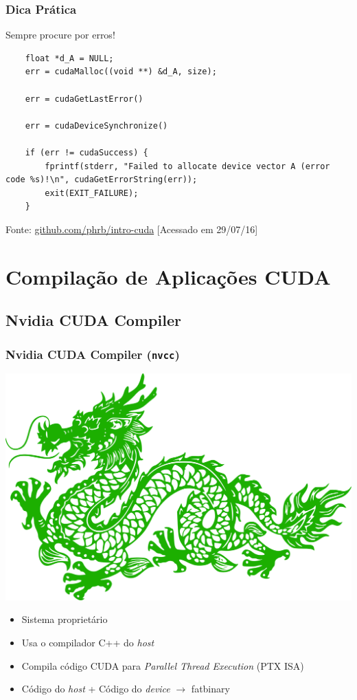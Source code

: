 \documentclass[10pt, compress]{beamer}
\begin{document}
\begin{frame}[fragile]
    \frametitle{Dica Prática}
    \alert{Sempre} procure por erros!

    \begin{lstlisting}
    float *d_A = NULL;
    err = cudaMalloc((void **) &d_A, size);

    err = cudaGetLastError()

    err = cudaDeviceSynchronize()

    if (err != cudaSuccess) {
        fprintf(stderr, "Failed to allocate device vector A (error code %s)!\n", cudaGetErrorString(err));
        exit(EXIT_FAILURE);
    }
    \end{lstlisting}

    \begin{center}
        \tiny{Fonte: \url{github.com/phrb/intro-cuda} [Acessado em 29/07/16]}
    \end{center}
\end{frame}

\section{Compilação de Aplicações CUDA}

\subsection{Nvidia CUDA Compiler}

\begin{frame}
    \frametitle{Nvidia CUDA Compiler (\texttt{nvcc})}
    \begin{center}
        \includegraphics[width=.55\textwidth]{compiler}
    \end{center}
    \pause
    \begin{itemize}
        \item Sistema \alert{proprietário}
            \pause
        \item Usa o compilador C++ do \textit{host}
            \pause
        \item Compila código CUDA para \textit{Parallel Thread Execution} (\alert{PTX} ISA)
            \pause
        \item Código do \textit{host} + Código do \textit{device} $\rightarrow$ \alert{fatbinary}
    \end{itemize}
\end{frame}
\end{document}
